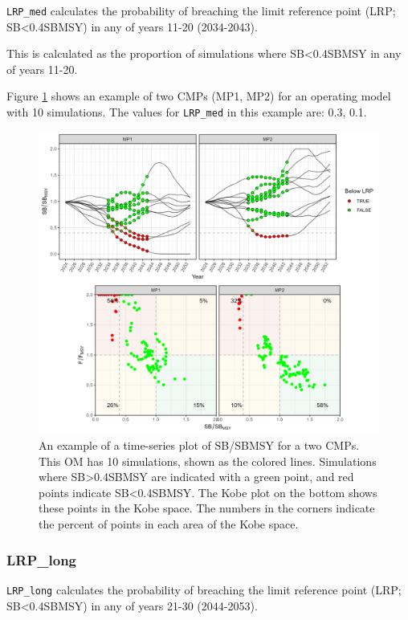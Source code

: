 \documentclass[
]{article}
\begin{document}
\texttt{LRP\_med} calculates the probability of breaching the limit reference point (LRP; SB\textless0.4SBMSY) in any of years 11-20 (2034-2043).

This is calculated as the proportion of simulations where SB\textless0.4SBMSY in any of years 11-20.

Figure \ref{fig:LRP-med} shows an example of two CMPs (MP1, MP2) for an operating model with 10 simulations. The values for \texttt{LRP\_med} in this example are: 0.3, 0.1.

\begin{figure}
\includegraphics[width=37.5in]{../../img/PMs/LRP_med} \caption{An example of a time-series plot of SB/SBMSY for a two CMPs. This OM has 10 simulations, shown as the colored lines. Simulations where SB>0.4SBMSY are indicated with a green point, and red points indicate SB<0.4SBMSY. The Kobe plot on the bottom shows these points in the Kobe space. The numbers in the corners indicate the percent of points in each area of the Kobe space.}\label{fig:LRP-med}
\end{figure}

\hypertarget{lrp_long}{%
\subsubsection{LRP\_long}\label{lrp_long}}

\texttt{LRP\_long} calculates the probability of breaching the limit reference point (LRP; SB\textless0.4SBMSY) in any of years 21-30 (2044-2053).
\end{document}
